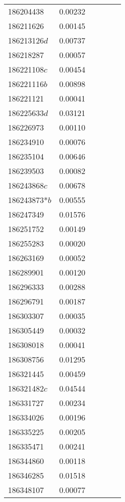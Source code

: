 \begin{landscape}
\begin{longtable}{p{1.8cm}p{2cm}p{2.2cm}p{1cm}p{2.8cm}p{12.3cm}}
186204438&0.00232&&&& \\
186211626&0.00145&&&& \\
186213126$d$&0.00737&&&& \\
186218287&0.00057&&&& \\
186221108$c$&0.00454&&&& \\
186221116$b$&0.00898&&&& \\
186221121&0.00041&&&& \\
186225633$d$&0.03121&&&& \\
186226973&0.00110&&&& \\
186234910&0.00076&&&& \\
186235104&0.00646&&&& \\
186239503&0.00082&&&& \\
186243868$c$&0.00678&&&& \\
186243873*$b$&0.00555&&&& \\
186247349&0.01576&&&& \\
186251752&0.00149&&&& \\
186255283&0.00020&&&& \\
186263169&0.00052&&&& \\
186289901&0.00120&&&& \\
186296333&0.00288&&&& \\
186296791&0.00187&&&& \\
186303307&0.00035&&&& \\
186305449&0.00032&&&& \\
186308018&0.00041&&&& \\
186308756&0.01295&&&& \\
186321445&0.00459&&&& \\
186321482$c$&0.04544&&&& \\
186331727&0.00234&&&& \\
186334026&0.00196&&&& \\
186335225&0.00205&&&& \\
186335471&0.00241&&&& \\
186344860&0.00118&&&& \\
186346285&0.01518&&&& \\
186348107&0.00077&&&& \\
\end{longtable}
\endgroup
\end{landscape}
